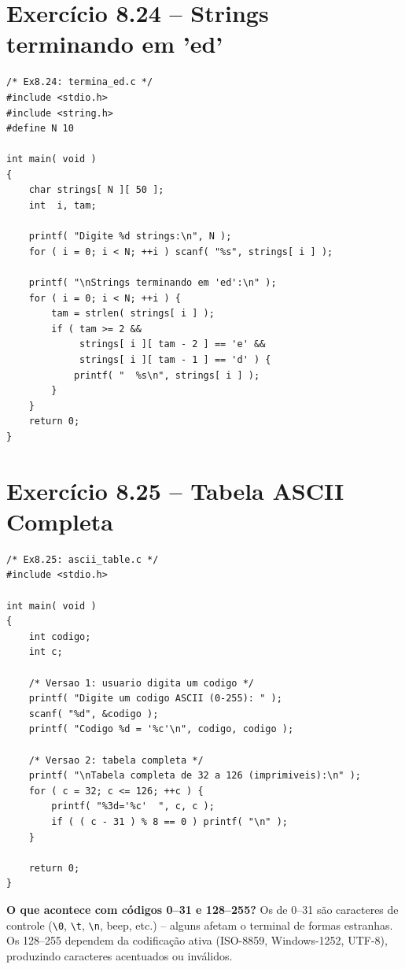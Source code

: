 \documentclass[12pt,a4paper]{article}
\begin{document}
\section{Exercício 8.24 -- Strings terminando em 'ed'}

\begin{respostabox}
\begin{lstlisting}
/* Ex8.24: termina_ed.c */
#include <stdio.h>
#include <string.h>
#define N 10

int main( void )
{
    char strings[ N ][ 50 ];
    int  i, tam;

    printf( "Digite %d strings:\n", N );
    for ( i = 0; i < N; ++i ) scanf( "%s", strings[ i ] );

    printf( "\nStrings terminando em 'ed':\n" );
    for ( i = 0; i < N; ++i ) {
        tam = strlen( strings[ i ] );
        if ( tam >= 2 &&
             strings[ i ][ tam - 2 ] == 'e' &&
             strings[ i ][ tam - 1 ] == 'd' ) {
            printf( "  %s\n", strings[ i ] );
        }
    }
    return 0;
}
\end{lstlisting}
\end{respostabox}

\newpage

\section{Exercício 8.25 -- Tabela ASCII Completa}

\begin{respostabox}
\begin{lstlisting}
/* Ex8.25: ascii_table.c */
#include <stdio.h>

int main( void )
{
    int codigo;
    int c;

    /* Versao 1: usuario digita um codigo */
    printf( "Digite um codigo ASCII (0-255): " );
    scanf( "%d", &codigo );
    printf( "Codigo %d = '%c'\n", codigo, codigo );

    /* Versao 2: tabela completa */
    printf( "\nTabela completa de 32 a 126 (imprimiveis):\n" );
    for ( c = 32; c <= 126; ++c ) {
        printf( "%3d='%c'  ", c, c );
        if ( ( c - 31 ) % 8 == 0 ) printf( "\n" );
    }

    return 0;
}
\end{lstlisting}

\textbf{O que acontece com códigos 0--31 e 128--255?} Os de 0--31 são caracteres
de controle (\texttt{\textbackslash 0}, \texttt{\textbackslash t}, \texttt{\textbackslash n},
beep, etc.) -- alguns afetam o terminal de formas estranhas. Os 128--255 dependem
da codificação ativa (ISO-8859, Windows-1252, UTF-8), produzindo caracteres
acentuados ou inválidos.
\end{respostabox}
\end{document}
